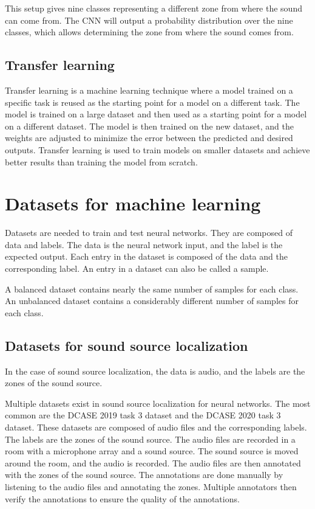 This setup gives nine classes representing a different zone from where the sound can come from. The CNN will output a probability distribution over the nine classes, which allows determining the zone from where the sound comes from.

\subsection{Transfer learning}

Transfer learning is a machine learning technique where a model trained on a specific task is reused as the starting point for a model on a different task. The model is trained on a large dataset and then used as a starting point for a model on a different dataset. The model is then trained on the new dataset, and the weights are adjusted to minimize the error between the predicted and desired outputs. Transfer learning is used to train models on smaller datasets and achieve better results than training the model from scratch.


\section{Datasets for machine learning}

Datasets are needed to train and test neural networks. They are composed of data and labels. The data is the neural network input, and the label is the expected output. Each entry in the dataset is composed of the data and the corresponding label. An entry in a dataset can also be called a sample. 

A balanced dataset contains nearly the same number of samples for each class. An unbalanced dataset contains a considerably different number of samples for each class.

\subsection{Datasets for sound source localization}
\label{sec:datasetsSSL}

In the case of sound source localization, the data is audio, and the labels are the zones of the sound source. 

Multiple datasets exist in sound source localization for neural networks. The most common are the DCASE 2019 task 3 dataset\cite{Adavanne2019_DCASE} and the DCASE 2020 task 3 dataset\cite{politis2020dataset}. These datasets are composed of audio files and the corresponding labels. The labels are the zones of the sound source. The audio files are recorded in a room with a microphone array and a sound source. The sound source is moved around the room, and the audio is recorded. The audio files are then annotated with the zones of the sound source. The annotations are done manually by listening to the audio files and annotating the zones. Multiple annotators then verify the annotations to ensure the quality of the annotations. 

